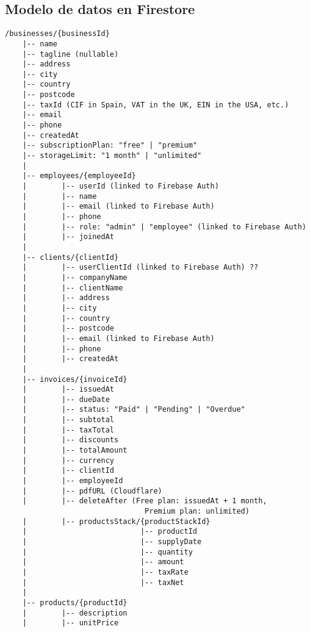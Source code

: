 \subsection*{Modelo de datos en Firestore}

\begin{large}

\begin{lstlisting}[language={},basicstyle=\ttfamily\small]
/businesses/{businessId}
    |-- name
    |-- tagline (nullable)
    |-- address
    |-- city
    |-- country
    |-- postcode
    |-- taxId (CIF in Spain, VAT in the UK, EIN in the USA, etc.)
    |-- email
    |-- phone
    |-- createdAt
    |-- subscriptionPlan: "free" | "premium"
    |-- storageLimit: "1 month" | "unlimited"
    |
    |-- employees/{employeeId}
    |        |-- userId (linked to Firebase Auth)
    |        |-- name
    |        |-- email (linked to Firebase Auth)
    |        |-- phone
    |        |-- role: "admin" | "employee" (linked to Firebase Auth)
    |        |-- joinedAt
    |
    |-- clients/{clientId}
    |        |-- userClientId (linked to Firebase Auth) ??
    |        |-- companyName
    |        |-- clientName
    |        |-- address
    |        |-- city
    |        |-- country
    |        |-- postcode
    |        |-- email (linked to Firebase Auth)
    |        |-- phone
    |        |-- createdAt
    |
    |-- invoices/{invoiceId}
    |        |-- issuedAt
    |        |-- dueDate
    |        |-- status: "Paid" | "Pending" | "Overdue"
    |        |-- subtotal
    |        |-- taxTotal
    |        |-- discounts
    |        |-- totalAmount
    |        |-- currency
    |        |-- clientId
    |        |-- employeeId
    |        |-- pdfURL (Cloudflare)
    |        |-- deleteAfter (Free plan: issuedAt + 1 month,
                                Premium plan: unlimited)
    |        |-- productsStack/{productStackId}
    |                          |-- productId
    |                          |-- supplyDate
    |                          |-- quantity
    |                          |-- amount
    |                          |-- taxRate
    |                          |-- taxNet
    |
    |-- products/{productId}
    |        |-- description
    |        |-- unitPrice
\end{lstlisting}


\end{large}
